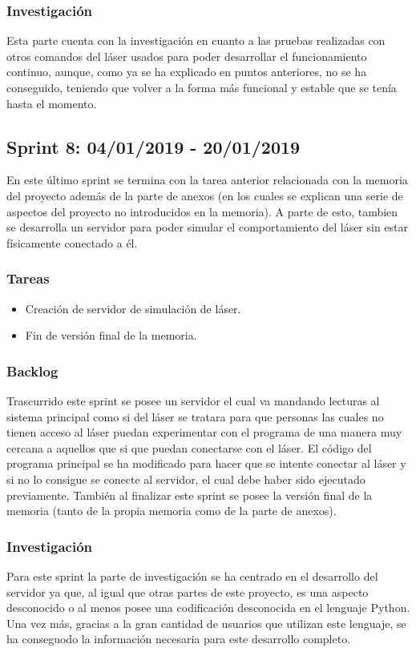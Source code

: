 \subsubsection{Investigación}
Esta parte cuenta con la investigación en cuanto a las pruebas realizadas con otros comandos del láser usados para poder desarrollar el funcionamiento continuo, aunque, como ya se ha explicado en puntos anteriores, no se ha conseguido, teniendo que volver a la forma más funcional y estable que se tenía hasta el momento.

\subsection{Sprint 8: 04/01/2019 - 20/01/2019}
En este último sprint se termina con la tarea anterior relacionada con la memoria del proyecto además de la parte de anexos (en los cuales se explican una serie de aspectos del proyecto no introducidos en la memoria). A parte de esto, tambien se desarrolla un servidor para poder simular el comportamiento del láser sin estar físicamente conectado a él.
\subsubsection{Tareas}
\begin{itemize}
	\item Creación de servidor de simulación de láser.
	\item Fin de versión final de la memoria.
\end{itemize}
\subsubsection{Backlog}
Trascurrido este sprint se posee un servidor el cual va mandando lecturas al sistema principal como si del láser se tratara para que personas las cuales no tienen acceso al láser puedan experimentar con el programa de una manera muy cercana a aquellos que si que puedan conectarse con el láser. El código del programa principal se ha modificado para hacer que se intente conectar al láser y si no lo consigue se conecte al servidor, el cual debe haber sido ejecutado previamente. También al finalizar este sprint se posee la versión final de la memoria (tanto de la propia memoria como de la parte de anexos).
\subsubsection{Investigación}
Para este sprint la parte de investigación se ha centrado en el desarrollo del servidor ya que, al igual que otras partes de este proyecto, es una aspecto desconocido o al menos posee una codificación desconocida en el lenguaje Python. Una vez más, gracias a la gran cantidad de usuarios que utilizan este lenguaje, se ha conseguodo la información necesaria para este desarrollo completo.

